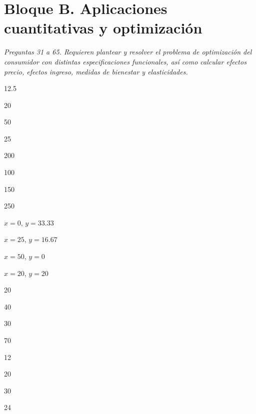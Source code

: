 \section*{Bloque B. Aplicaciones cuantitativas y optimización}

\noindent\textit{Preguntas 31 a 65. Requieren plantear y resolver el problema de optimización del consumidor con distintas especificaciones funcionales, así como calcular efectos precio, efectos ingreso, medidas de bienestar y elasticidades.}

\begin{opts}
    \item 12.5
    \item 20
    \item 50
    \item 25
\end{opts}

\begin{opts}
    \item 200
    \item 100
    \item 150
    \item 250
\end{opts}

\begin{opts}
    \item $x=0$, $y=33.33$
    \item $x=25$, $y=16.67$
    \item $x=50$, $y=0$
    \item $x=20$, $y=20$
\end{opts}

\begin{opts}
    \item 20
    \item 40
    \item 30
    \item 70
\end{opts}

\begin{opts}
    \item 12
    \item 20
    \item 30
    \item 24
\end{opts}

